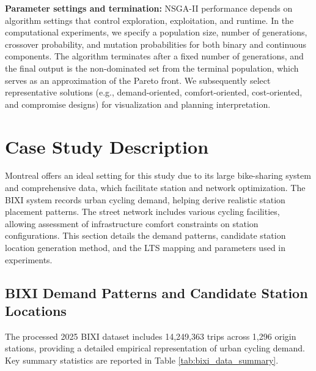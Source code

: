 \documentclass[preprint,authoryear,10pt]{elsarticle}
\begin{document}
\textbf{Parameter settings and termination:} NSGA-II performance depends on algorithm settings that control exploration, exploitation, and runtime. In the computational experiments, we specify a population size, number of generations, crossover probability, and mutation probabilities for both binary and continuous components. The algorithm terminates after a fixed number of generations, and the final output is the non-dominated set from the terminal population, which serves as an approximation of the Pareto front. We subsequently select representative solutions (e.g., demand-oriented, comfort-oriented, cost-oriented, and compromise designs) for visualization and planning interpretation.




\section{Case Study Description}\label{casestudy}

Montreal offers an ideal setting for this study due to its large bike-sharing system and comprehensive data, which facilitate station and network optimization. The BIXI system records urban cycling demand, helping derive realistic station placement patterns. The street network includes various cycling facilities, allowing assessment of infrastructure comfort constraints on station configurations. This section details the demand patterns, candidate station location generation method, and the LTS mapping and parameters used in experiments.

\subsection{BIXI Demand Patterns and Candidate Station Locations}\label{subsec:bixi_demand}

The processed 2025 BIXI dataset includes 14,249,363 trips across 1,296 origin stations, providing a detailed empirical representation of urban cycling demand. Key summary statistics are reported in Table \ref{tab:bixi_data_summary}.
\end{document}
